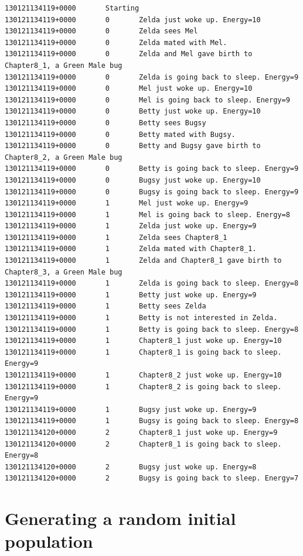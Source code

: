 \documentclass[a4paper,10pt]{report}
\begin{document}
\begin{verbatim}
130121134119+0000       Starting
130121134119+0000       0       Zelda just woke up. Energy=10
130121134119+0000       0       Zelda sees Mel
130121134119+0000       0       Zelda mated with Mel.
130121134119+0000       0       Zelda and Mel gave birth to Chapter8_1, a Green Male bug
130121134119+0000       0       Zelda is going back to sleep. Energy=9
130121134119+0000       0       Mel just woke up. Energy=10
130121134119+0000       0       Mel is going back to sleep. Energy=9
130121134119+0000       0       Betty just woke up. Energy=10
130121134119+0000       0       Betty sees Bugsy
130121134119+0000       0       Betty mated with Bugsy.
130121134119+0000       0       Betty and Bugsy gave birth to Chapter8_2, a Green Male bug
130121134119+0000       0       Betty is going back to sleep. Energy=9
130121134119+0000       0       Bugsy just woke up. Energy=10
130121134119+0000       0       Bugsy is going back to sleep. Energy=9
130121134119+0000       1       Mel just woke up. Energy=9
130121134119+0000       1       Mel is going back to sleep. Energy=8
130121134119+0000       1       Zelda just woke up. Energy=9
130121134119+0000       1       Zelda sees Chapter8_1
130121134119+0000       1       Zelda mated with Chapter8_1.
130121134119+0000       1       Zelda and Chapter8_1 gave birth to Chapter8_3, a Green Male bug
130121134119+0000       1       Zelda is going back to sleep. Energy=8
130121134119+0000       1       Betty just woke up. Energy=9
130121134119+0000       1       Betty sees Zelda
130121134119+0000       1       Betty is not interested in Zelda.
130121134119+0000       1       Betty is going back to sleep. Energy=8
130121134119+0000       1       Chapter8_1 just woke up. Energy=10
130121134119+0000       1       Chapter8_1 is going back to sleep. Energy=9
130121134119+0000       1       Chapter8_2 just woke up. Energy=10
130121134119+0000       1       Chapter8_2 is going back to sleep. Energy=9
130121134119+0000       1       Bugsy just woke up. Energy=9
130121134119+0000       1       Bugsy is going back to sleep. Energy=8
130121134120+0000       2       Chapter8_1 just woke up. Energy=9
130121134120+0000       2       Chapter8_1 is going back to sleep. Energy=8
130121134120+0000       2       Bugsy just woke up. Energy=8
130121134120+0000       2       Bugsy is going back to sleep. Energy=7
\end{verbatim}

\chapter{Generating a random initial population}
\label{sec:random}
\end{document}
